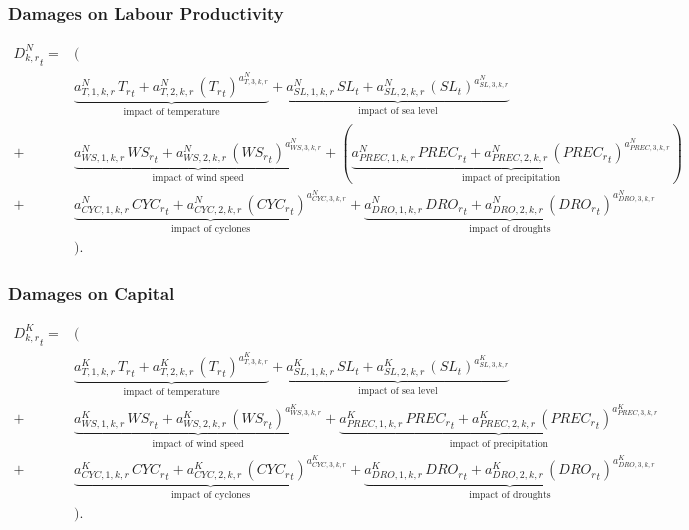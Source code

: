 \documentclass[11pt,aspectratio=169]{beamer}
\begin{document}
\begin{frame}
\frametitle{Damages on Labour Productivity}
\tiny
\begin{align*}
{{D^{N}_{k,r}}_{t}}=& \Big( \nonumber \\
&\underbrace{{{a^{N}_{T,1,k,r}}} \, {{T_{r}}_{t}}+{{a^{N}_{T,2,k,r}}}\, \left({T_{r}}_{t}\right)^{a^{N}_{T,3,k,r}}}_{\mbox{impact of temperature}} + 
\underbrace{{{a^{N}_{SL,1,k,r}}}\, {{SL}_{t}}+{{a^{N}_{SL,2,k,r}}}\, \left({SL}_{t}\right)^{{{a^{N}_{SL,3,k,r}}}}}_{\mbox{impact of sea level}} \nonumber \\
+ & \underbrace{{{a^{N}_{WS,1,k,r}}}\, {{WS_{r}}_{t}}+{{a^{N}_{WS,2,k,r}}}\, \left({WS_{r}}_{t}\right)^{{{a^{N}_{WS,3,k,r}}}}}_{\mbox{impact of wind speed}} 
+ (\underbrace{{{a^{N}_{PREC,1,k,r}}} \, {{PREC_{r}}_{t}}+{{a^{N}_{PREC,2,k,r}}}\, \left({PREC_{r}}_{t}\right)^{{{a^{N}_{PREC,3,k,r}}}}}_{\mbox{impact of precipitation}}) \,  \nonumber \\
+ & \underbrace{{{a^{N}_{CYC,1,k,r}}}\, {{CYC_{r}}_{t}}+{{a^{N}_{CYC,2,k,r}}}\, \left({CYC_{r}}_{t}\right)^{{{a^{N}_{CYC,3,k,r}}}}}_{\mbox{impact of cyclones}}
+ \underbrace{{{a^{N}_{DRO,1,k,r}}} \, {{DRO_{r}}_{t}}+{{a^{N}_{DRO,2,k,r}}}\, \left({DRO_{r}}_{t}\right)^{{{a^{N}_{DRO,3,k,r}}}}}_{\mbox{impact of droughts}} \nonumber \\
&\Big).
\end{align*}
\end{frame}

\begin{frame}
\frametitle{Damages on Capital}
\tiny
\begin{align*}
{{D^{K}_{k,r}}_{t}}=& \Big( \nonumber \\
&\underbrace{{{a^{K}_{T,1,k,r}}} \, {{T_{r}}_{t}}+{{a^{K}_{T,2,k,r}}}\, \left({T_{r}}_{t}\right)^{a^{K}_{T,3,k,r}}}_{\mbox{impact of temperature}}+ \underbrace{{{a^{K}_{SL,1,k,r}}}\, {{SL}_{t}}+{{a^{K}_{SL,2,k,r}}}\, \left({SL}_{t}\right)^{{{a^{K}_{SL,3,k,r}}}}}_{\mbox{impact of sea level}} \nonumber \\
+ & \underbrace{{{a^{K}_{WS,1,k,r}}}\, {{WS_{r}}_{t}}+{{a^{K}_{WS,2,k,r}}}\, \left({WS_{r}}_{t}\right)^{{{a^{K}_{WS,3,k,r}}}}}_{\mbox{impact of wind speed}}
+ \underbrace{{{a^{K}_{PREC,1,k,r}}} \, {{PREC_{r}}_{t}}+{{a^{K}_{PREC,2,k,r}}}\, \left({PREC_{r}}_{t}\right)^{{{a^{K}_{PREC,3,k,r}}}}}_{\mbox{impact of precipitation}} \nonumber \\
+ & \underbrace{{{a^{K}_{CYC,1,k,r}}}\, {{CYC_{r}}_{t}}+{{a^{K}_{CYC,2,k,r}}}\, \left({CYC_{r}}_{t}\right)^{{{a^{K}_{CYC,3,k,r}}}}}_{\mbox{impact of cyclones}}
+ \underbrace{{{a^{K}_{DRO,1,k,r}}} \, {{DRO_{r}}_{t}}+{{a^{K}_{DRO,2,k,r}}}\, \left({DRO_{r}}_{t}\right)^{{{a^{K}_{DRO,3,k,r}}}}}_{\mbox{impact of droughts}} \nonumber \\
&\Big).
\end{align*}
\end{frame}
\end{document}
